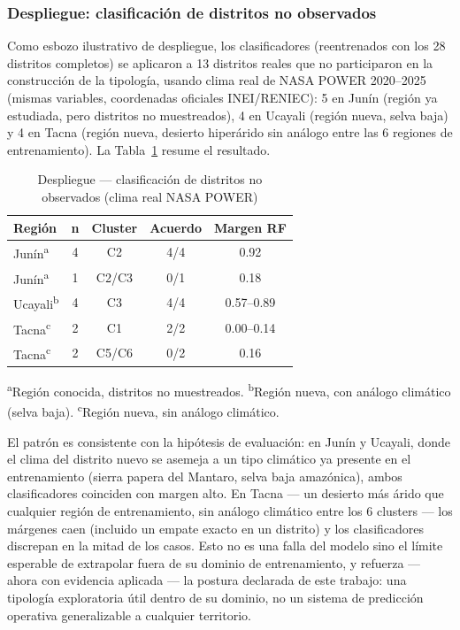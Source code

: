 \documentclass[conference]{IEEEtran}
\begin{document}
\subsubsection{Despliegue: clasificación de distritos no observados}
Como esbozo ilustrativo de despliegue, los clasificadores (reentrenados con los 28 distritos completos) se aplicaron a 13 distritos reales que no participaron en la construcción de la tipología, usando clima real de NASA POWER 2020--2025 (mismas variables, coordenadas oficiales INEI/RENIEC): 5 en Junín (región ya estudiada, pero distritos no muestreados), 4 en Ucayali (región nueva, selva baja) y 4 en Tacna (región nueva, desierto hiperárido sin análogo entre las 6 regiones de entrenamiento). La Tabla~\ref{tab:clasificador_despliegue} resume el resultado.

\begin{table}[h]
\centering
\caption{Despliegue --- clasificación de distritos no observados (clima real NASA POWER)}
\label{tab:clasificador_despliegue}
\small
\begin{tabular}{l c c c c}
\toprule
\textbf{Región} & \textbf{n} & \textbf{Cluster} & \textbf{Acuerdo} & \textbf{Margen RF} \\
\midrule
Junín\textsuperscript{a} & 4 & C2 & 4/4 & 0.92 \\
Junín\textsuperscript{a} & 1 & C2/C3 & 0/1 & 0.18 \\
Ucayali\textsuperscript{b} & 4 & C3 & 4/4 & 0.57--0.89 \\
Tacna\textsuperscript{c} & 2 & C1 & 2/2 & 0.00--0.14 \\
Tacna\textsuperscript{c} & 2 & C5/C6 & 0/2 & 0.16 \\
\bottomrule
\end{tabular}

\vspace{2pt}
{\footnotesize \textsuperscript{a}Región conocida, distritos no muestreados. \textsuperscript{b}Región nueva, con análogo climático (selva baja). \textsuperscript{c}Región nueva, sin análogo climático.}
\end{table}

El patrón es consistente con la hipótesis de evaluación: en Junín y Ucayali, donde el clima del distrito nuevo se asemeja a un tipo climático ya presente en el entrenamiento (sierra papera del Mantaro, selva baja amazónica), ambos clasificadores coinciden con margen alto. En Tacna --- un desierto más árido que cualquier región de entrenamiento, sin análogo climático entre los 6 clusters --- los márgenes caen (incluido un empate exacto en un distrito) y los clasificadores discrepan en la mitad de los casos. Esto no es una falla del modelo sino el límite esperable de extrapolar fuera de su dominio de entrenamiento, y refuerza --- ahora con evidencia aplicada --- la postura declarada de este trabajo: una tipología exploratoria útil dentro de su dominio, no un sistema de predicción operativa generalizable a cualquier territorio.
\end{document}
